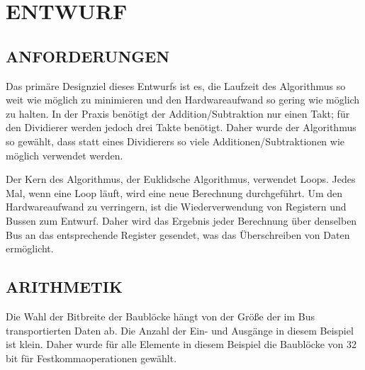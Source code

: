 \chapter{ENTWURF}
\label{sec:security_analyse}

\section{ANFORDERUNGEN}
\label{sec:Threat_model}
Das primäre Designziel dieses Entwurfs ist es, die Laufzeit des Algorithmus so weit wie möglich zu minimieren und den Hardwareaufwand so gering wie möglich zu halten. In der Praxis benötigt der Addition/Subtraktion nur einen Takt; für den Dividierer werden jedoch drei Takte benötigt. Daher wurde der Algorithmus so gewählt, dass statt eines Dividierers so viele Additionen/Subtraktionen wie möglich verwendet werden.

\noindent Der Kern des Algorithmus, der Euklidsche Algorithmus, verwendet Loops. Jedes Mal, wenn eine Loop läuft, wird eine neue Berechnung durchgeführt. Um den Hardwareaufwand zu verringern, ist die Wiederverwendung von Registern und Bussen zum Entwurf. Daher wird das Ergebnis jeder Berechnung über denselben Bus an das entsprechende Register gesendet, was das Überschreiben von Daten ermöglicht.

\section{ARITHMETIK}
\label{sec:security_analyse_oci_analysis}
Die Wahl der Bitbreite der Baublöcke hängt von der Größe der im Bus transportierten Daten ab. Die Anzahl der Ein- und Ausgänge in diesem Beispiel ist klein. Daher wurde für alle Elemente in diesem Beispiel die Baublöcke von 32 bit für Festkommaoperationen gewählt.
 
\vspace{\baselineskip}

